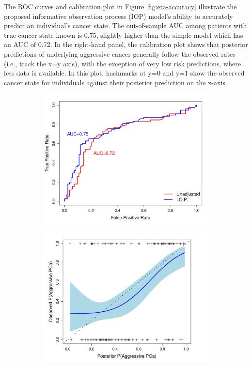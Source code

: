 \documentclass[12pt, letterpaper]{article}
\begin{document}
The ROC curves and calibration plot in Figure \ref{fig:eta-accuracy} illustrate the proposed informative observation process (IOP) model's ability to accurately predict an individual's cancer state. The out-of-sample AUC among patients with true cancer state known is 0.75, slightly higher than the simple model which has an AUC of 0.72. In the right-hand panel, the calibration plot shows that posterior predictions of underlying aggressive cancer generally follow the observed rates (i.e., track the x=y axis), with the exception of very low risk predictions, where less data is available. In this plot, hashmarks at y=0 and y=1 show the observed cancer state for individuals against their posterior prediction on the x-axis. 
\begin{figure}
\begin{center}
\begin{subfigure}[b]{0.45\textwidth}
\includegraphics[width=\textwidth]{pred-vs-obs-eta-roc}
\label{fig:roc}
\end{subfigure}
\begin{subfigure}[b]{0.45\textwidth}
\includegraphics[width=\textwidth]{pred-vs-obs-eta}

\end{subfigure}
\end{center}
\end{figure}
\end{document}
